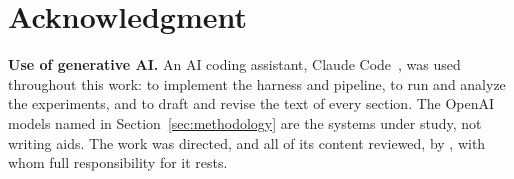 \section*{Acknowledgment}
\textbf{Use of generative AI.} An AI coding assistant, Claude
Code~\cite{anthropic2026claudecode}, was used throughout this work: to
implement the harness and pipeline, to run and analyze the experiments, and
to draft and revise the text of every section. The OpenAI models named in
Section~\ref{sec:methodology} are the systems under study, not writing aids.
The work was directed, and all of its content reviewed, by
\responsibleauthor{}, with whom full responsibility for it rests.
